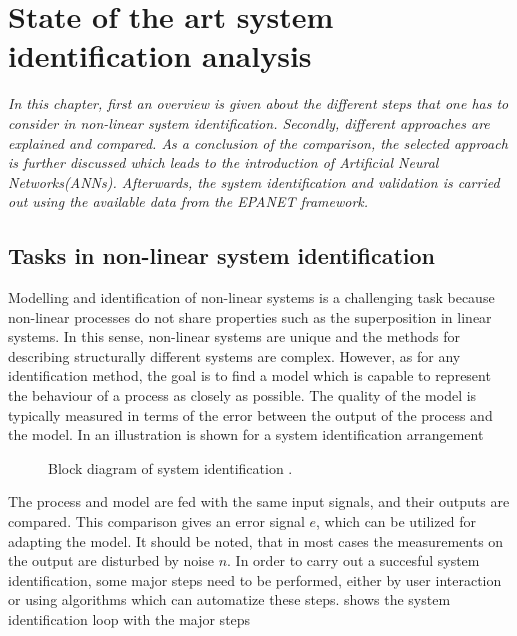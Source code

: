 \chapter{State of the art system identification analysis}
\label{identification_methods}

\emph{In this chapter, first an overview is given about the different steps that one has to consider in non-linear system identification. Secondly, different approaches are explained and compared. As a conclusion of the comparison, the selected approach is further discussed which leads to the introduction of Artificial Neural Networks(ANNs). Afterwards, the system identification and validation is carried out using the available data from the EPANET framework.}

\section{Tasks in non-linear system identification}
\label{tasks_nonlinear_sys_identification}

Modelling and identification of non-linear systems is a challenging task because non-linear processes do not share properties such as the superposition in linear systems. In this sense, non-linear systems are unique and the methods for describing structurally different systems are complex. However, as for any identification method, the goal is to find a model which is capable to represent the behaviour of a process as closely as possible. The quality of the model is typically measured in terms of the error between the output of the process and the model. In  an illustration is shown for a system identification arrangement 
\vspace{-3mm}
\begin{figure}[H]
\centering
 
\vspace{-3mm}
\caption{Block diagram of system identification \cite{nelles2013nonlinear}.}
\label{fig:nonlin_block}
\end{figure}

\vspace{-4mm}

The process and model are fed with the same input signals, and their outputs are compared. This comparison gives an error signal $e$, which can be utilized for adapting the model. It should be noted, that in most cases the measurements on the output are disturbed by noise $n$. In order to carry out a succesful system identification, some major steps need to be performed, either by user interaction or using algorithms which can automatize these steps.  shows the system identification loop with the major steps


